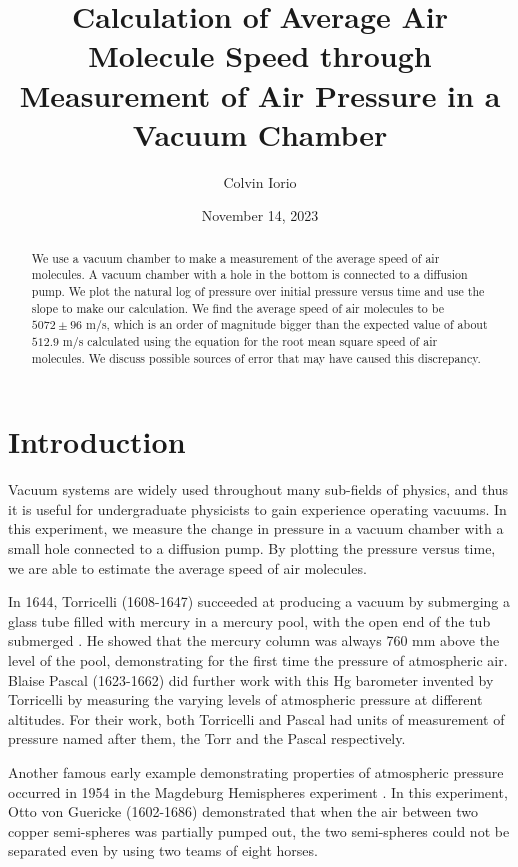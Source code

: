 \documentclass[11pt,letterpaper]{article}
\begin{document}
\title{Calculation of Average Air Molecule Speed through Measurement of Air Pressure in a Vacuum Chamber}

\author{Colvin Iorio}

\date{November 14, 2023}
\maketitle


\begin{abstract}
    We use a vacuum chamber to make a measurement of the average speed of air molecules. A vacuum chamber with a hole in the bottom is connected to a diffusion pump. We plot the natural log of pressure over initial pressure versus time and use the slope to make our calculation. We find the average speed of air molecules to be $5072 \pm 96$ m/s, which is an order of magnitude bigger than the expected value of about $512.9$ m/s calculated using the equation for the root mean square speed of air molecules. We discuss possible sources of error that may have caused this discrepancy.
\end{abstract}


\section{Introduction}\label{sec intro}

Vacuum systems are widely used throughout many sub-fields of physics, and thus it is useful for undergraduate physicists to gain experience operating vacuums. In this experiment, we measure the change in pressure in a vacuum chamber with a small hole connected to a diffusion pump. By plotting the pressure versus time, we are able to estimate the average speed of air molecules.

In 1644, Torricelli (1608-1647) succeeded at producing a vacuum by submerging a glass tube filled with mercury in a mercury pool, with the open end of the tub submerged \cite{Marquardt}. He showed that the mercury column was always 760 mm above the level of the pool, demonstrating for the first time the pressure of atmospheric air. Blaise Pascal (1623-1662) did further work with this Hg barometer invented by Torricelli by measuring the varying levels of atmospheric pressure at different altitudes. For their work, both Torricelli and Pascal had units of measurement of pressure named after them, the Torr and the Pascal respectively.

Another famous early example demonstrating properties of atmospheric pressure occurred in 1954 in the Magdeburg Hemispheres experiment \cite{Marquardt}. In this experiment, Otto von Guericke (1602-1686) demonstrated that when the air between two copper semi-spheres was partially pumped out, the two semi-spheres could not be separated even by using two teams of eight horses.
\end{document}

